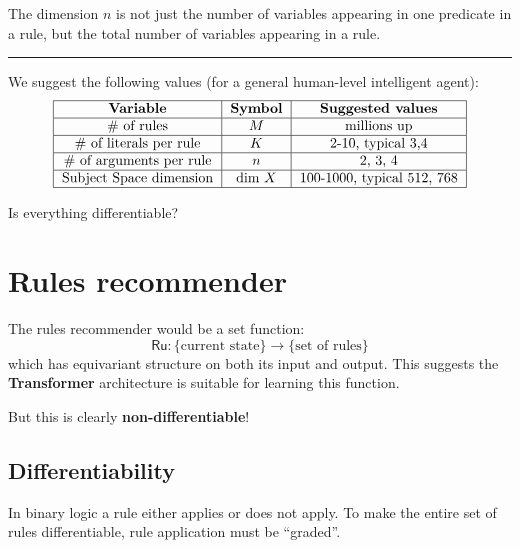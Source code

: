 The dimension $n$ is not just the number of variables appearing in one predicate in a rule, but the total number of variables appearing in a rule.

\vspace{1cm} \hrule \vspace{1cm}

We suggest the following values (for a general human-level intelligent agent):
\begin{equation}
\begin{tabular}{|c|c|c|}
	\hline
	\textbf{Variable} & \textbf{Symbol} & \textbf{Suggested values} \\
	\hline
	\# of rules & $M$ &  millions up \\
	\hline
	\# of literals per rule & $K$ &  2-10, typical 3,4 \\
	\hline
	\# of arguments per rule & $n$ & 2, 3, 4  \\
	\hline
	Subject Space dimension & dim $X$ &  100-1000, typical 512, 768 \\
	\hline
\end{tabular}
\end{equation}

Is everything differentiable?

\section{Rules recommender}

The rules recommender would be a set function:
\begin{equation}
\mathsf{Ru}: \{ \mbox{current state} \} \rightarrow \{ \mbox{set of rules} \}
\end{equation}
which has equivariant structure on both its input and output.  This suggests the \textbf{Transformer} architecture is suitable for learning this function.

But this is clearly \textbf{non-differentiable}!  

\subsection{Differentiability}

In binary logic a rule either applies or does not apply.  To make the entire set of rules differentiable, rule application must be ``graded''.

